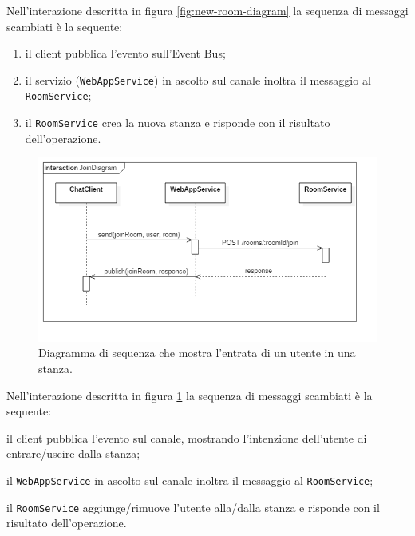 \documentclass[a4paper]{article}
\begin{document}
Nell'interazione descritta in figura \ref{fig:new-room-diagram} la sequenza di messaggi scambiati è la sequente:
\begin{enumerate}[label=(\arabic*)]
%
    \item il client pubblica l'evento sull'Event Bus;
%
    \item il servizio (\texttt{WebAppService}) in ascolto sul canale inoltra il messaggio al \texttt{RoomService};
    
    \item il \texttt{RoomService} crea la nuova stanza e risponde con il risultato dell'operazione.
\end{enumerate}

\begin{figure}[H]
    \centering
    \includegraphics[width=\linewidth, height=\textheight, keepaspectratio]{res/JoinDiagram.png}
        \caption{Diagramma di sequenza che mostra l'entrata di un utente in una stanza.}
    \label{fig:enter-diagram}
\end{figure}

Nell'interazione descritta in figura \ref{fig:enter-diagram} la sequenza di messaggi scambiati è la sequente:
\begin{enumerate*}[label=(\arabic*)]
%
    \item il client pubblica l'evento sul canale, mostrando l'intenzione dell'utente di entrare/uscire dalla stanza;
%
    \item il \texttt{WebAppService} in ascolto sul canale inoltra il messaggio al \texttt{RoomService};
%   
    \item il \texttt{RoomService} aggiunge/rimuove l'utente alla/dalla stanza e risponde con il risultato dell'operazione.
%
\end{enumerate*}
\end{document}

